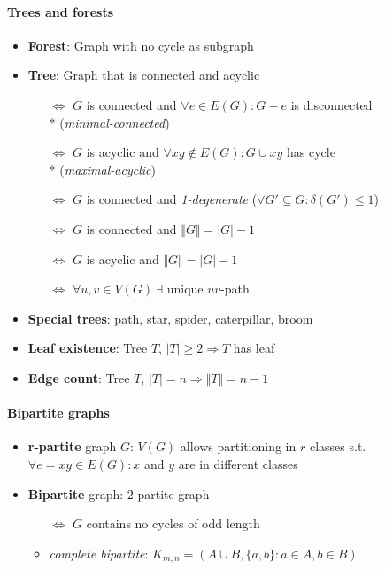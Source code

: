 \paragraph{Trees and forests}
\begin{itemize}
  \item \textbf{Forest}: Graph with no cycle as subgraph
  \item \textbf{Tree}: Graph that is connected and acyclic
  \begin{itemize}
    \item[$ \Leftrightarrow $] $ G $ is connected and $ \forall e \in E(G): G-e $ is disconnected \\* (\emph{minimal-connected})
    \item[$ \Leftrightarrow $] $ G $ is acyclic and $ \forall xy \not \in E(G) : G \cup xy $ has cycle \\* (\emph{maximal-acyclic})
    \item[$ \Leftrightarrow $] $ G $ is connected and \emph{1-degenerate} ($ \forall G' \subseteq G : \delta(G') \leq 1 $) 
    \item[$ \Leftrightarrow $] $ G $ is connected and $ \Vert G \Vert = \vert G \vert - 1 $
    \item[$ \Leftrightarrow $] $ G $ is acyclic and $ \Vert G \Vert = \vert G \vert - 1 $
    \item[$ \Leftrightarrow $] $ \forall u,v \in V(G) \ \exists $ unique $ uv $-path
  \end{itemize}
  \item \textbf{Special trees}: path, star, spider, caterpillar, broom
  \item \textbf{Leaf existence}: Tree $ T $, $ \vert T \vert \geq 2 \Rightarrow T $ has leaf
  \item \textbf{Edge count}: Tree $ T $, $ \vert T \vert = n \Rightarrow \Vert T \Vert = n-1 $ 
\end{itemize}

\paragraph{Bipartite graphs}
\begin{itemize}
  \item \textbf{r-partite} graph $ G $: $ V(G) $ allows partitioning in $ r $ classes s.t. $ \forall e=xy \in E(G) : x $ and $ y $ are in different classes
  \item \textbf{Bipartite} graph: $ 2 $-partite graph
  \begin{itemize}
    \item[$ \Leftrightarrow $] $ G $ contains no cycles of odd length
    \item \emph{complete bipartite}: $ K_{m,n} = (A \cup B, \{ a,b \} : a \in A, b \in B) $ 
  \end{itemize}
\end{itemize}

